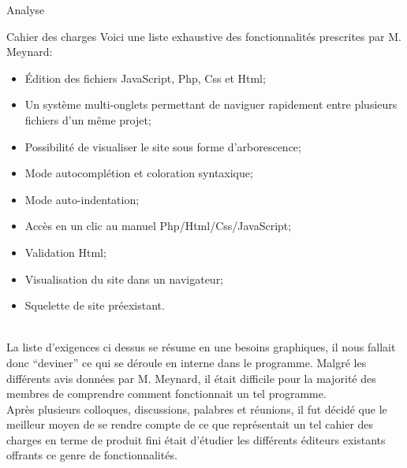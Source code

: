 \documentclass[a4paper, 12pt]{report}
\begin{document}
	\begin{part}{Analyse}
		\begin{chapter}{Cahier des charges}
			Voici une liste exhaustive des fonctionnalités prescrites par M. Meynard:
			\begin{itemize}
				\item Édition des fichiers JavaScript, Php, Css et Html;
				\item Un système multi-onglets permettant de naviguer rapidement entre plusieurs fichiers d'un même projet;
				\item Possibilité de visualiser le site sous forme d'arborescence;
				\item Mode \gls{autocomplétion} et coloration syntaxique;
				\item Mode auto-indentation;
				\item Accès en un clic au manuel Php/Html/Css/JavaScript;
				\item Validation Html;
				\item Visualisation du site dans un navigateur;
				\item Squelette de site préexistant.
			\end{itemize}~\\

			La liste d'exigences ci dessus se résume en une besoins graphiques, il nous fallait donc ``deviner'' ce qui se déroule en interne 
			dans le programme. Malgré les différents avis données par M. Meynard, il était difficile pour la majorité des membres de
			comprendre comment fonctionnait un tel programme.\\

			Après plusieurs colloques, discussions, palabres et réunions, il fut décidé que le meilleur moyen de se rendre compte de ce que
			représentait un tel cahier des charges en terme de produit fini était d'étudier les différents éditeurs existants offrants ce 
			genre de fonctionnalités.
		\end{chapter}


\end{part}
\end{document}

